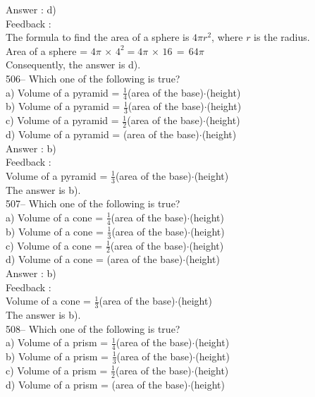 \documentclass[letterpaper, 12pt]{article}
\begin{document}
Answer : d)\\

Feedback : \\
The formula to find the area of a sphere is $4\pi r^{2}$, where $r$ is the radius.  \\
Area of a sphere = $4\pi\,\times\,4^{2}=4\pi\,\times\,16\,=\,64\pi$\\
Consequently, the answer is d).\\

506-- Which one of the following is true?\\
a) Volume of a pyramid = $\frac{1}{4}$(area of the
base)$\cdot$(height)\\[2mm]
b) Volume of a pyramid = $\frac{1}{3}$(area of the
base)$\cdot$(height)\\[2mm]
c) Volume of a pyramid = $\frac{1}{2}$(area of the
base)$\cdot$(height)\\[2mm]
d) Volume of a pyramid = (area of the base)$\cdot$(height)\\

Answer : b)\\

Feedback :  \\
Volume of a pyramid = $\frac{1}{3}$(area of the base)$\cdot$(height)\\
The answer is b).\\

507-- Which one of the following is true?\\
a) Volume of a cone = $\frac{1}{4}$(area of the
base)$\cdot$(height)\\[2mm]
b) Volume of a cone = $\frac{1}{3}$(area of the
base)$\cdot$(height)\\[2mm]
c) Volume of a cone = $\frac{1}{2}$(area of the
base)$\cdot$(height)\\[2mm]
d) Volume of a cone = (area of the base)$\cdot$(height)\\

Answer : b)\\

Feedback :  \\
Volume of a cone = $\frac{1}{3}$(area of the base)$\cdot$(height)\\
The answer is b).\\

508-- Which one of the following is true?\\
a) Volume of a prism = $\frac{1}{4}$(area of the
base)$\cdot$(height)\\[2mm]
b) Volume of a prism = $\frac{1}{3}$(area of the
base)$\cdot$(height)\\[2mm]
c) Volume of a prism = $\frac{1}{2}$(area of the
base)$\cdot$(height)\\[2mm]
d) Volume of a prism = (area of the base)$\cdot$(height)\\
\end{document}
